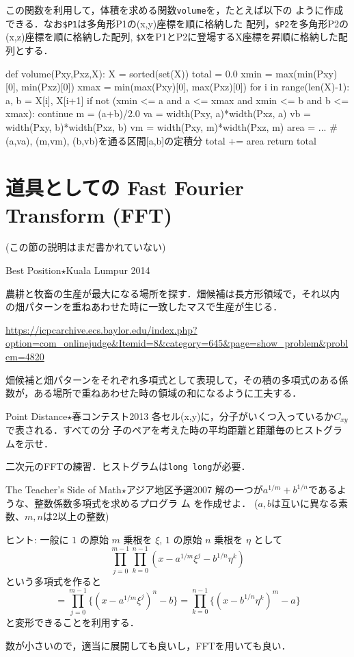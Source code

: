 \begin{versionbeta}
この関数を利用して，体積を求める関数\texttt{volume}を，たとえば以下の
ように作成できる．なお\texttt{\$P1}は多角形P1の(x,y)座標を順に格納した
配列，\texttt{\$P2}を多角形P2の(x,z)座標を順に格納した配列,  \texttt{\$X}をP1とP2に登場するX座標を昇順に格納した配列とする．

\begin{pybox}[emph={volume},emph={[2]width,total}]
def volume(Pxy,Pxz,X):
    X = sorted(set(X))
    total = 0.0
    xmin = max(min(Pxy)[0], min(Pxz)[0])
    xmax = min(max(Pxy)[0], max(Pxz)[0])
    for i in range(len(X)-1):
        a, b = X[i], X[i+1]
        if not (xmin <= a and a <= xmax and xmin <= b and b <= xmax):
            continue
        m = (a+b)/2.0
        va = width(Pxy, a)*width(Pxz, a)
        vb = width(Pxy, b)*width(Pxz, b)
        vm = width(Pxy, m)*width(Pxz, m)
        area = ... # (a,va), (m,vm), (b,vb)を通る区間[a,b]の定積分
        total += area
    return total
\end{pybox}
\section{道具としての Fast Fourier Transform (FFT)}
(この節の説明はまだ書かれていない)

\begin{pbox}{Best Position$\star$}{Kuala Lumpur 2014}
  
農耕と牧畜の生産が最大になる場所を探す．畑候補は長方形領域で，それ以内
の畑パターンを重ねあわせた時に一致したマスで生産が生じる．

  \url{https://icpcarchive.ecs.baylor.edu/index.php?option=com_onlinejudge&Itemid=8&category=645&page=show_problem&problem=4820}
\end{pbox}

畑候補と畑パターンをそれぞれ多項式として表現して，その積の多項式のある係数が，ある場所で重ねあわせた時の領域の和になるように工夫する．

\begin{pbox}{Point Distance$\star$}{春コンテスト2013}
各セル(x,y)に，分子がいくつ入っているか$C_{xy}$で表される．すべての分
子のペアを考えた時の平均距離と距離毎のヒストグラムを示せ．

\end{pbox}

二次元のFFTの練習．ヒストグラムは\texttt{long long}が必要．

\begin{pbox}{The Teacher's Side of Math$\star$}{アジア地区予選2007}
解の一つが$a^{1/m}+b^{1/n}$であるような、整数係数多項式を求めるプログラ
ム
を作成せよ．
($a,b$は互いに異なる素数、$m,n$は2以上の整数)

\end{pbox}

ヒント: 
一般に $1$ の原始 $m$ 乗根を $\xi$, $1$ の原始 $n$ 乗根を $\eta$ として
$$
\prod_{j=0}^{m-1}\prod_{k=0}^{n-1}
(x-a^{1/m}\xi^j-b^{1/n}\eta^k)
$$
という多項式を作ると
$$
=\prod_{j=0}^{m-1}\{(x-a^{1/m}\xi^j)^n-b\}
=\prod_{k=0}^{n-1}\{(x-b^{1/n}\eta^k)^m-a\}
$$
と変形できることを利用する．

数が小さいので，適当に展開しても良いし，FFTを用いても良い．

\end{versionbeta}
